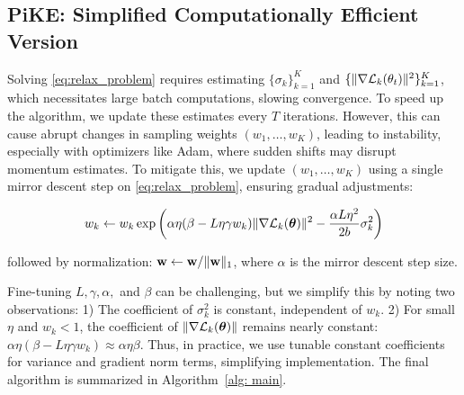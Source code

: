 %
%

%


%

\normalsize

\subsection{PiKE: Simplified Computationally Efficient Version}  
\label{sec:PiKe}  

Solving \eqref{eq:relax_problem} requires estimating $\{\sigma_k\}_{k=1}^K$ and $\{\|\nabla \mathcal{L}_k (\theta_t)\|^2\}_{k=1}^K$, which necessitates large batch computations, slowing convergence. To speed up the algorithm, we update these estimates every \(T\) iterations. However, this can cause abrupt changes in sampling weights \((w_1,\ldots, w_K)\), leading to instability, especially with optimizers like Adam, where sudden shifts may disrupt momentum estimates.  
To mitigate this, we update \((w_1, \dots, w_K)\) using a single mirror descent step on \eqref{eq:relax_problem}, ensuring gradual adjustments:  

\vspace{-0.3cm}

{\small  
\begin{align}  
    w_k \gets w_k \exp\left(  
    \alpha \eta (\beta-L\eta \gamma w_k) \|\nabla \mathcal{L}_k(\bm{\theta})\|^2   
    - \frac{\alpha L \eta^2}{2b} \sigma_k^2  
    \right) \nonumber  
\end{align}  
}  

\vspace{-0.3cm}

\noindent followed by normalization: \( \mathbf{w} \gets \mathbf{w} / \|\mathbf{w}\|_1 \), where \(\alpha\) is the mirror descent step size.  

Fine-tuning \( L, \gamma, \alpha, \) and \( \beta \) can be challenging, but we simplify this by noting two observations:  
1) The coefficient of \( \sigma_k^2 \) is constant, independent of \( w_k \).  
2) For small \( \eta \) and \( w_k < 1 \), the coefficient of \( \|\nabla \mathcal{L}_k (\bm{\theta})\| \) remains nearly constant:  
$  
  \alpha \eta (\beta-L\eta \gamma w_k) \approx \alpha \eta \beta.
$  
Thus, in practice, we use tunable  constant coefficients for variance and gradient norm terms, simplifying implementation. The final algorithm is summarized in Algorithm~\ref{alg: main}.  



%
%
%
%
%
%
%
%
%
%
%
%
%
%


